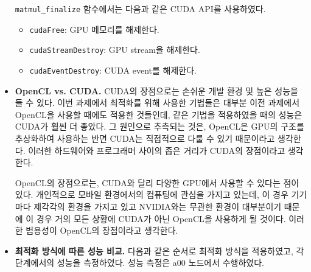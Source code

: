 \begin{itemize}
{        \texttt{matmul\_finalize} 함수에서는 다음과 같은 CUDA API를 사용하였다.

        \begin{itemize}
            \item \texttt{cudaFree}: GPU 메모리를 해제한다.
            \item \texttt{cudaStreamDestroy}: GPU stream을 해제한다.
            \item \texttt{cudaEventDestroy}: CUDA event를 해제한다.
        \end{itemize}

    }
    \item {
        \textbf{OpenCL vs. CUDA.} CUDA의 장점으로는 손쉬운 개발 환경 및 높은 성능을 들 수 있다.
        이번 과제에서 최적화를 위해 사용한 기법들은 대부분 이전 과제에서 OpenCL을 사용할 때에도 적용한 것들인데,
        같은 기법을 적용하였을 때의 성능은 CUDA가 훨씬 더 좋았다. 그 원인으로 추측되는 것은, OpenCL은
        GPU의 구조를 추상화하여 사용하는 반면 CUDA는 직접적으로 다룰 수 있기 때문이라고 생각한다. 이러한
        하드웨어와 프로그래머 사이의 좁은 거리가 CUDA의 장점이라고 생각한다.

        OpenCL의 장점으로는, CUDA와 달리 다양한 GPU에서 사용할 수 있다는 점이 있다. 개인적으로 모바일 환경에서의
        컴퓨팅에 관심을 가지고 있는데, 이 경우 기기마다 제각각의 환경을 가지고 있고 NVIDIA와는 무관한 환경이
        대부분이기 때문에 이 경우 거의 모든 상황에 CUDA가 아닌 OpenCL을 사용하게 될 것이다. 이러한 범용성이 OpenCL의
        장점이라고 생각한다.
        
    }
    \item {
        \textbf{최적화 방식에 따른 성능 비교.}
        다음과 같은 순서로 최적화 방식을 적용하였고, 각 단계에서의 성능을 측정하였다.
        성능 측정은 a00 노드에서 수행하였다.

}
\end{itemize}
